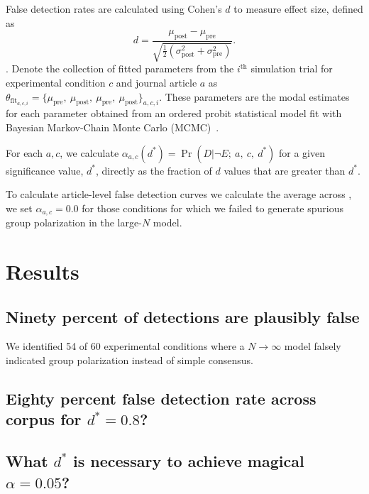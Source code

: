 \documentclass[
  abstract]{article}
\newcommand{\mupre}{\mu_\mathrm{pre}}
\newcommand{\mupost}{\mu_\mathrm{post}}
\newcommand{\sigmapre}{\sigma_\mathrm{pre}}
\newcommand{\sigmapost}{\sigma_\mathrm{post}}
\newcommand{\thetafit}{\theta_\mathrm{fit}}
\begin{document}
False detection rates are calculated using Cohen's $d$ to measure effect
size, defined as~\cite[p. 331]{Liddell2018}
\begin{equation}
  d = \frac{\mupost - \mupre}{\sqrt{\frac{1}{2}(\sigmapost^2 + \sigmapre^2)}}.
\end{equation}. 
\noindent
Denote the collection of fitted parameters from the $i^\mathrm{th}$ simulation trial
for experimental condition $c$ and journal article $a$ as
$\thetafit_{a,c,i} = \{\mupre,~\mupost,~\mupre,~\mupost\}_{a,c,i}$.
These parameters are the modal estimates for each parameter obtained from
an ordered probit statistical model fit with
Bayesian Markov-Chain Monte Carlo (MCMC)~\cite[p. 338]{Liddell2018}. 

For each $a,c$, we calculate $\alpha_{a,c}(d^*) =
\Pr(D |\neg E;~a,~c,~d^*)$ for a given significance value, $d^*$, directly as
the fraction of $d$ values that are greater than $d^*$.

To calculate article-level false detection curves we calculate the average
across , we set $\alpha_{a,c} = 0.0$ for those
conditions for which we failed to generate spurious group polarization in the
large-$N$ model.






\section{Results}\label{results}


\subsection{Ninety percent of detections are plausibly false}

We identified 54 of 60 experimental 
conditions where a $N \to \infty$ model falsely indicated group polarization 
instead of simple consensus.

\subsection{Eighty percent false detection rate across corpus for $d^*=0.8$?}

\subsection{What $d^*$ is necessary to achieve magical $\alpha = 0.05$?}
\end{document}
